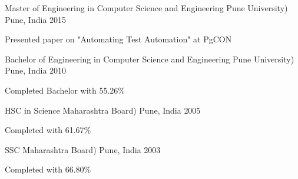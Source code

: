 

\begin{cventries}

  \cventry
    {Master of Engineering in Computer Science and Engineering} %
    {Pune University)} %
    {Pune, India} %
    {2015} %
    {
      \begin{cvitems} %
        \item {Presented paper on "Automating Test Automation" at PgCON}
      \end{cvitems}
    }
	\cventry
    {Bachelor of Engineering in Computer Science and Engineering} %
    {Pune University)} %
    {Pune, India} %
    {2010} %
    {
      \begin{cvitems} %
        \item {Completed Bachelor with 55.26\%}
      \end{cvitems}
    }
	\cventry
    {HSC in Science} %
    {Maharashtra Board)} %
    {Pune, India} %
    {2005} %
    {
      \begin{cvitems} %
        \item {Completed with 61.67\%}
      \end{cvitems}
    }
	\cventry
    {SSC} %
    {Maharashtra Board)} %
    {Pune, India} %
    {2003} %
    {
      \begin{cvitems} %
        \item {Completed with 66.80\%}
      \end{cvitems}
    }
\end{cventries}
